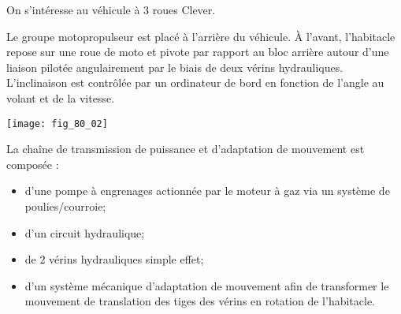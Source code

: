 \normaltrue \difficilefalse \tdifficilefalse
\correctionfalse

\setcounter{question}{0}%
\ifcorrection
\else
{}
\fi




On s'intéresse au véhicule à 3 roues Clever.

\ifprof
\else


 Le groupe motopropulseur est placé à l'arrière du véhicule. À l’avant, l’habitacle repose sur une roue de moto et pivote par rapport au bloc arrière autour d’une liaison pilotée angulairement par le biais de deux vérins hydrauliques. L'inclinaison est contrôlée par un ordinateur de bord en fonction de l'angle au volant et de la vitesse. 

\begin{marginfigure}
\texttt{[image: fig\_80\_02]}
\end{marginfigure}


La chaîne de transmission de puissance et d’adaptation de mouvement est composée :
\begin{itemize}
\item d’une pompe à engrenages actionnée par le moteur à gaz via un système de poulies/courroie;
\item d’un circuit hydraulique;
\item de 2 vérins hydrauliques simple effet;
\item d’un système mécanique d’adaptation de mouvement afin de transformer le mouvement de translation des tiges des vérins en rotation de l’habitacle.
\end{itemize}


